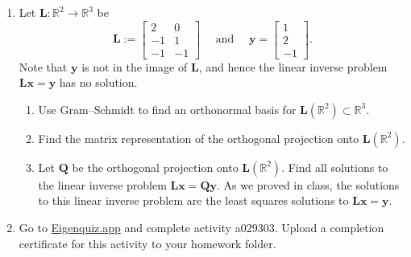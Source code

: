 \documentclass[12pt]{amsart}
\newcommand{\1}{\mathbbm{1}}
\numberwithin{equation}{section}
\numberwithin{Theorem}{section}
\theoremstyle{plain} %
\theoremstyle{definition}
\theoremstyle{remark}
\begin{document}
\begin{enumerate}[1.]
\hrule \bigskip

\begin{enumerate}[(d)]
	\item 
	\begin{proof}
		
		\begin{align*}
			\langle \mathbf{u}, \mathbf{Q}\mathbf{v} \rangle
			&= 
		\end{align*}
	\end{proof}

	\item
	\begin{proof}
		content...
	\end{proof}
	
	\item
	\begin{proof}
		content...
	\end{proof}
\end{enumerate}

\clearpage

\item Let \(\mathbf{L}:\mathbb{R}^{2}\to\mathbb{R}^{3}\) be
\[\mathbf{L}:=\begin{bmatrix} 2 & 0\\ -1 & 1\\ -1 & -1\end{bmatrix}\quad\text{ and }\quad \mathbf{y} = \begin{bmatrix}1\\2\\-1\end{bmatrix}.\]
Note that \(\mathbf{y}\) is not in the image of \(\mathbf{L}\), and hence the linear inverse problem \(\mathbf{Lx}=\mathbf{y}\) has no solution. \bigskip

\begin{enumerate}

\item Use Gram--Schmidt to find an orthonormal basis for \(\mathbf{L}(\mathbb{R}^{2})\subset\mathbb{R}^{3}\).\bigskip

\item Find the matrix representation of the orthogonal projection onto \(\mathbf{L}(\mathbb{R}^{2})\).\bigskip

\item Let \(\mathbf{Q}\) be the orthogonal projection onto \(\mathbf{L}(\mathbb{R}^{2})\). Find all solutions to the linear inverse problem \(\mathbf{Lx}=\mathbf{Qy}\). As we proved in class, the solutions to this linear inverse problem are the least squares solutions to \(\mathbf{Lx}=\mathbf{y}\).\bigskip

\end{enumerate}

\vspace{\fill}

\item Go to \href{https://eigenquiz.app/}{Eigenquiz.app} and complete activity a029303. Upload a completion certificate for this activity to your homework folder.

\end{enumerate}
\end{document}
